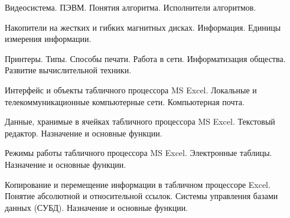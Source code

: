\documentclass[
	14pt,
	a4paper,
	]
	{scrartcl}
\begin{document}
\shapk
{}
\setcounter{zad}{0}

\vfill
\z Видеосистема. ПЭВМ.
 \vfill
\z Понятия алгоритма. Исполнители алгоритмов. 
 \vfill

\vfill

\newpage


\shapk
{}
\setcounter{zad}{0}

\vfill
\z Накопители на жестких и гибких магнитных дисках.
 \vfill
\z Информация. Единицы измерения информации. 
 \vfill

\vfill

\newpage


\shapk
{}
\setcounter{zad}{0}

\vfill
\z Принтеры. Типы. Способы печати. Работа в сети.
 \vfill
\z Информатизация общества. Развитие вычислительной техники. 
 \vfill

\vfill

\newpage


\shapk
{}
\setcounter{zad}{0}

\vfill
\z Интерфейс и объекты табличного процессора MS Excel.
 \vfill
\z Локальные и телекоммуникационные компьютерные сети. Компьютерная почта. 
 \vfill

\vfill

\newpage


\shapk
{}
\setcounter{zad}{0}

\vfill
\z Данные, хранимые в ячейках табличного процессора MS Excel.
 \vfill
\z Текстовый редактор. Назначение и основные функции. 
 \vfill

\vfill

\newpage


\shapk
{}
\setcounter{zad}{0}

\vfill
\z Режимы работы табличного процессора MS Excel.
 \vfill
\z Электронные таблицы. Назначение и основные функции. 
 \vfill

\vfill

\newpage


\shapk
{}
\setcounter{zad}{0}

\vfill
\z Копирование и перемещение информации в табличном процессоре Excel. Понятие абсолютной и относительной ссылок.
 \vfill
\z Системы управления базами данных (СУБД). Назначение и основные функции. 
 \vfill

\vfill

\newpage
\end{document}
